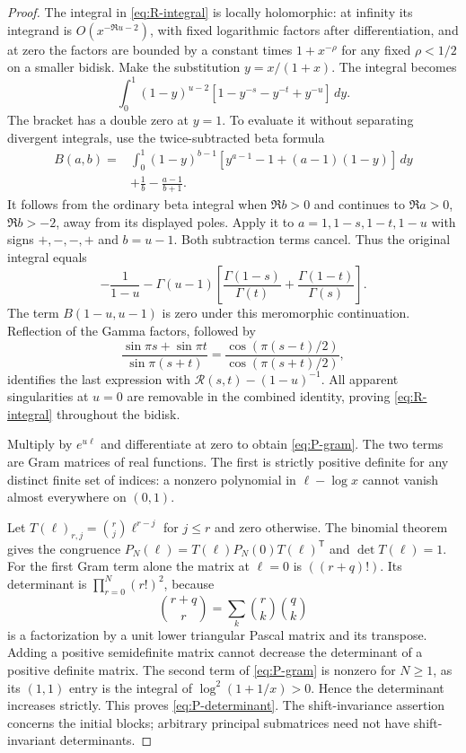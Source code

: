 \begin{proof}
The integral in \eqref{eq:R-integral} is locally holomorphic: at
infinity its integrand is $O(x^{-\Re u-2})$, with fixed logarithmic
factors after differentiation, and at zero the factors are bounded
by a constant times $1+x^{-\rho}$ for any fixed $\rho<1/2$ on a
smaller bidisk. Make the substitution $y=x/(1+x)$. The integral
becomes
\[
 \int_0^1(1-y)^{u-2}
       [1-y^{-s}-y^{-t}+y^{-u}]\,dy.
\]
The bracket has a double zero at $y=1$. To evaluate it without
separating divergent integrals, use the twice-subtracted beta formula
\begin{align*}
 B(a,b)={}&\int_0^1(1-y)^{b-1}
       [y^{a-1}-1+(a-1)(1-y)]\,dy\\
 &+\frac1b-\frac{a-1}{b+1}.
\end{align*}
It follows from the ordinary beta integral when $\Re b>0$ and
continues to $\Re a>0$, $\Re b>-2$, away from its displayed poles.
Apply it to $a=1,1-s,1-t,1-u$ with signs $+,-,-,+$ and
$b=u-1$. Both subtraction terms cancel. Thus the original integral
equals
\[
 -\frac1{1-u}-\Gamma(u-1)
 \left[\frac{\Gamma(1-s)}{\Gamma(t)}
             +\frac{\Gamma(1-t)}{\Gamma(s)}\right].
\]
The term $B(1-u,u-1)$ is zero under this meromorphic continuation.
Reflection of the Gamma factors, followed by
\[
 \frac{\sin\pi s+\sin\pi t}{\sin\pi(s+t)}
 =\frac{\cos(\pi(s-t)/2)}{\cos(\pi(s+t)/2)},
\]
identifies the last expression with $\mathcal R(s,t)-(1-u)^{-1}$.
All apparent singularities at $u=0$ are removable in the combined
identity, proving \eqref{eq:R-integral} throughout the bidisk.

Multiply by $e^{u\ell}$ and differentiate at zero to obtain
\eqref{eq:P-gram}. The two terms are Gram matrices of real functions.
The first is strictly positive definite for any distinct finite
set of indices: a nonzero polynomial in $\ell-\log x$ cannot
vanish almost everywhere on $(0,1)$.

Let $T(\ell)_{r,j}=\binom rj\ell^{r-j}$ for $j\leq r$ and zero
otherwise. The binomial theorem gives the congruence
$P_N(\ell)=T(\ell)P_N(0)T(\ell)^{\mathsf T}$ and
$\det T(\ell)=1$. For the first Gram term alone the matrix at
$\ell=0$ is $((r+q)!)$. Its determinant is
$\prod_{r=0}^N(r!)^2$, because
\[
 \binom{r+q}{r}=\sum_k\binom rk\binom qk
\]
is a factorization by a unit lower triangular Pascal matrix and its
transpose. Adding a positive semidefinite matrix cannot decrease
the determinant of a positive definite matrix. The second term of
\eqref{eq:P-gram} is nonzero for $N\geq1$, as its $(1,1)$ entry is
the integral of $\log^2(1+1/x)>0$. Hence the determinant increases
strictly. This proves \eqref{eq:P-determinant}. The shift-invariance
assertion concerns the initial blocks; arbitrary principal submatrices
need not have shift-invariant determinants.
\end{proof}

